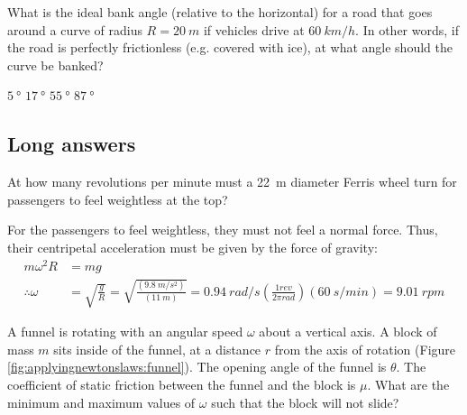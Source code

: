 \question What is the ideal bank angle (relative to the horizontal) for a road that goes around a curve of radius $R=\SI{20}{m}$ if vehicles drive at $\SI{60}{km/h}$. In other words, if the road is perfectly frictionless (e.g. covered with ice), at what angle should the curve be banked?
\begin{checkboxes}
\choice    $\SI{5}{\degree}$
\choice  $\SI{17}{\degree}$
\CorrectChoice  $\SI{55}{\degree}$
\choice    $\SI{87}{\degree}$
\end{checkboxes}

%
%
\subsection{Long answers}

\question At how many revolutions per minute must a \SI{22}{m} diameter Ferris wheel turn for passengers to feel weightless at the top?
\begin{solution}
For the passengers to feel weightless, they must not feel a normal force. Thus, their centripetal acceleration must be given by the force of gravity:
\begin{align*}
m\omega^2R&=mg\\
\therefore \omega&=\sqrt{\frac{g}{R}}=\sqrt{\frac{(\SI{9.8}{m/s^2})}{(\SI{11}{m})}}=\SI{0.94}{rad/s}\left(\frac{1\si{rev}}{2\pi\si{rad}}\right)\left( \SI{60}{s/min} \right)=\SI{9.01}{rpm}
\end{align*}
\end{solution}


\question A funnel is rotating with an angular speed $\omega$ about a vertical axis. A block of mass $m$ sits inside of the funnel, at a distance $r$ from the axis of rotation (Figure \ref{fig:applyingnewtonslaws:funnel}). The opening angle of the funnel is $\theta$. The coefficient of static friction between the funnel and the block is $\mu$. What are the minimum and maximum values of $\omega$ such that the block will not slide?

